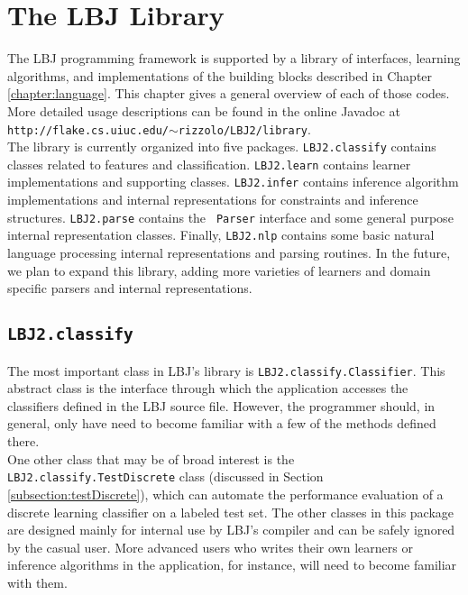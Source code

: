 
\chapter{The LBJ Library}

The LBJ programming framework is supported by a library of interfaces,
learning algorithms, and implementations of the building blocks described in
Chapter \ref{chapter:language}.  This chapter gives a general overview of each
of those codes.  More detailed usage descriptions can be found in the online
Javadoc at {\tt http://flake.cs.uiuc.edu/$\sim$rizzolo/LBJ2/library}. \\

The library is currently organized into five packages.  {\tt LBJ2.classify}
contains classes related to features and classification.  {\tt LBJ2.learn}
contains learner implementations and supporting classes.  {\tt LBJ2.infer}
contains inference algorithm implementations and internal representations for
constraints and inference structures.  {\tt LBJ2.parse} contains the {\tt
Parser} interface and some general purpose internal representation classes.
Finally, {\tt LBJ2.nlp} contains some basic natural language processing
internal representations and parsing routines.  In the future, we plan to
expand this library, adding more varieties of learners and domain specific
parsers and internal representations.

\section{{\tt LBJ2.classify}}

The most important class in LBJ's library is {\tt LBJ2.classify.Classifier}.
This abstract class is the interface through which the application accesses
the classifiers defined in the LBJ source file.  However, the programmer
should, in general, only have need to become familiar with a few of the
methods defined there. \\

One other class that may be of broad interest is the {\tt
LBJ2.classify.TestDiscrete} class (discussed in Section
\ref{subsection:testDiscrete}), which can automate the performance evaluation
of a discrete learning classifier on a labeled test set.  The other classes in
this package are designed mainly for internal use by LBJ's compiler and can be
safely ignored by the casual user.  More advanced users who writes their own
learners or inference algorithms in the application, for instance, will need
to become familiar with them.

